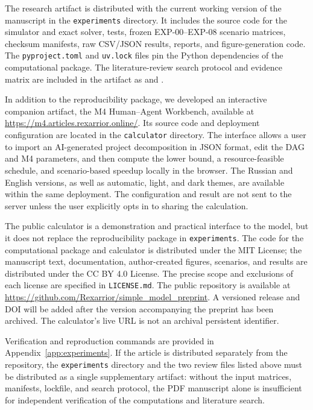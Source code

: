 {\sloppy
The research artifact is distributed with the current working version of the
manuscript in the \texttt{experiments} directory. It includes the source code
for the simulator and exact solver, tests, frozen EXP-00--EXP-08 scenario
matrices, checksum manifests, raw CSV/JSON results, reports, and figure-generation
code. The \texttt{pyproject.toml} and \texttt{uv.lock} files pin the Python
dependencies of the computational package. The literature-review search
protocol and evidence matrix are included in the artifact as
 and
.\par}

In addition to the reproducibility package, we developed an interactive
companion artifact, the M4 Human--Agent Workbench, available at
\url{https://m4.articles.rexarrior.online/}. Its source code and deployment
configuration are located in the \texttt{calculator} directory. The interface
allows a user to import an AI-generated project decomposition in JSON format,
edit the DAG and M4 parameters, and then compute the lower bound, a
resource-feasible schedule, and scenario-based speedup locally in the browser.
The Russian and English versions, as well as automatic, light, and dark themes,
are available within the same deployment. The configuration and result are not
sent to the server unless the user explicitly opts in to sharing the
calculation.

The public calculator is a demonstration and practical interface to the model,
but it does not replace the reproducibility package in \texttt{experiments}.
The code for the computational package and calculator is distributed under the
MIT License; the manuscript text, documentation, author-created figures,
scenarios, and results are distributed under the CC BY 4.0 License. The precise
scope and exclusions of each license are specified in \texttt{LICENSE.md}. The
public repository is available at
\url{https://github.com/Rexarrior/simple_model_preprint}. A versioned release
and DOI will be added after the version accompanying the preprint has been
archived. The calculator's live URL is not an archival persistent identifier.

Verification and reproduction commands are provided in
Appendix~\ref{app:experiments}. If the article is distributed separately from
the repository, the \texttt{experiments} directory and the two review files
listed above must be distributed as a single supplementary artifact: without
the input matrices, manifests, lockfile, and search protocol, the PDF manuscript
alone is insufficient for independent verification of the computations and
literature search.
